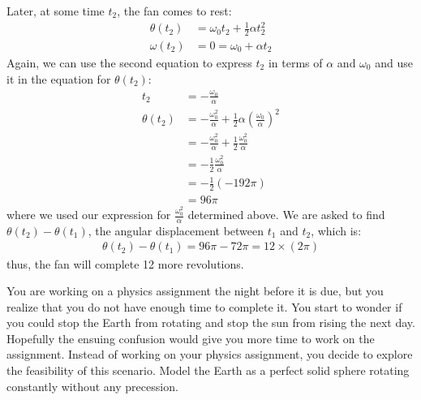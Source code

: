 \begin{solution}
Later, at some time $t_2$, the fan comes to rest:
\begin{align*}
\theta(t_2)&=\omega_0t_2+\frac{1}{2}\alpha t_2^2\\
\omega(t_2)&=0=\omega_0+\alpha t_2
\end{align*}
Again, we can use the second equation to express $t_2$ in terms of $\alpha$ and $\omega_0$ and use it in the equation for $\theta(t_2)$:
\begin{align*}
t_2&=-\frac{\omega_0}{\alpha}\\
\theta(t_2)&=-\frac{\omega_0^2}{\alpha}+\frac{1}{2}\alpha \left(\frac{\omega_0}{\alpha}\right)^2\\
&=-\frac{\omega_0^2}{\alpha}+\frac{1}{2}\frac{\omega_0^2}{\alpha}\\
&=-\frac{1}{2}\frac{\omega_0^2}{\alpha}\\
&=-\frac{1}{2}(-192\pi)\\
&=96\pi
\end{align*}
where we used our expression for $\frac{\omega_0^2}{\alpha}$ determined above. We are asked to find $\theta(t_2)-\theta(t_1)$, the angular displacement between $t_1$ and $t_2$, which is:
\begin{align*}
\theta(t_2)-\theta(t_1)=96\pi-72\pi=12\times(2\pi)
\end{align*}
thus, the fan will complete 12 more revolutions.
\end{solution}

\question You are working on a physics assignment the night before it is due, but you realize that you do not have enough time to complete it. You start to wonder if you could stop the Earth from rotating and stop the sun from rising the next day. Hopefully the ensuing confusion would give you more time to work on the assignment. Instead of working on your physics assignment, you decide to explore the feasibility of this scenario. Model the Earth as a perfect solid sphere rotating constantly without any precession.


